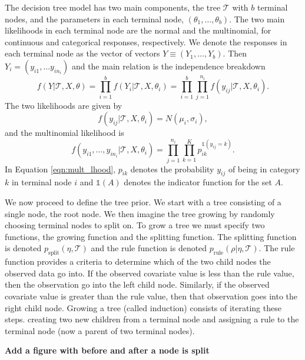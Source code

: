 The decision tree model has two main components, the tree $\mathcal{T}$ with $b$ terminal nodes, and the parameters in each terminal node, $(\theta_1,\dots,\theta_b)$. 
The two main likelihoods in each terminal node are the normal and the multinomial, for continuous and categorical responses, respectively. 
We denote the responses in each terminal node as the vector  of vectors $Y\equiv (Y_1, \dots, Y_b)$. Then $Y_i = (y_{i1}, \dots y_{in_i})$ and the main relation is the independence breakdown 
\begin{equation}
f(Y\vert \mathcal{T}, X, \theta) =\prod_{i=1}^b f(Y_i\vert \mathcal{T}, X, \theta_i) = \prod_{i=1}^b \prod_{j=1}^{n_i} f(y_{ij} \vert \mathcal{T}, X, \theta_i).
\end{equation}
The two likelihoods are given by
\begin{equation}
f(y_{ij} \vert \mathcal{T}, X, \theta_i) = N(\mu_i,\sigma_i),
\end{equation}
and the multinomial likelihood is
\begin{equation}\label{eqn:mult_lhood}
f(y_{i1}, \dots ,y_{in_i} \vert \mathcal{T}, X, \theta_i) = \prod_{j=1}^{n_i}\prod_{k=1}^K p_{ik}^{\mathds{1}(y_{ij}=k)}.
\end{equation}
In Equation \ref{eqn:mult_lhood}, $p_{ik}$ denotes the probability $y_{ij}$ of being in category $k$ in terminal node $i$ and $\mathds{1}(A)$ denotes the indicator function for the set $A$. 

We now proceed to define the tree prior. We start with a tree consisting of a single node, the root node. We then imagine the tree growing by randomly choosing terminal nodes to split on. To grow a tree we must specify two functions, the growing function and the splitting function.  The splitting function is denoted $p_{\text{split}}(\eta, \mathcal{T})$ and the rule function is denoted $p_{\text{rule}}(\rho \vert \eta, \mathcal{T})$. The rule function provides a criteria to determine which of the two child nodes the observed data go into. If the observed covariate value is less than the rule value, then the observation go into the left child node. Similarly, if the observed covariate value is greater than the rule value, then that observation goes into the right child node. Growing a tree (called induction) consists of iterating these steps. creating two new children from a terminal node and assigning a rule to the terminal node (now a parent of two terminal nodes). 

\begin{center}\huge{\textbf{Add a figure with before and after a node is split}} \end{center}

